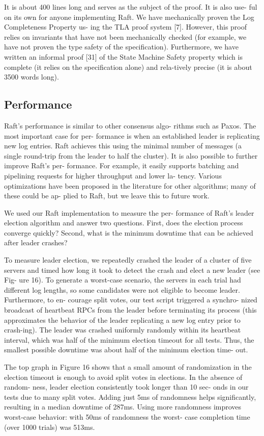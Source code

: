 \documentclass[journal]{IEEEtran}
\begin{document}
It is about 400 lines long and serves as the subject of the proof. It is also use- ful on its own for anyone implementing Raft. 
We have mechanically proven the Log Completeness Property us- ing the TLA proof system [7]. However, this proof relies on invariants that have not been mechanically checked (for example, we have not proven the type safety of the specification). Furthermore, we have written an informal proof [31] of the State Machine Safety property which is complete (it relies on the specification alone) and rela-tively precise (it is about 3500 words long).

\subsection{Performance}
Raft’s performance is similar to other consensus algo- rithms such as Paxos. The most important case for per- formance is when an established leader is replicating new log entries. Raft achieves this using the minimal number of messages (a single round-trip from the leader to half the cluster). It is also possible to further improve Raft’s per- formance. For example, it easily supports batching and pipelining requests for higher throughput and lower la- tency. Various optimizations have been proposed in the literature for other algorithms; many of these could be ap- plied to Raft, but we leave this to future work.

We used our Raft implementation to measure the per- formance of Raft’s leader election algorithm and answer two questions. First, does the election process converge quickly? Second, what is the minimum downtime that can be achieved after leader crashes?

To measure leader election, we repeatedly crashed the leader of a cluster of five servers and timed how long it took to detect the crash and elect a new leader (see Fig- ure 16). To generate a worst-case scenario, the servers in each trial had different log lengths, so some candidates were not eligible to become leader. Furthermore, to en- courage split votes, our test script triggered a synchro- nized broadcast of heartbeat RPCs from the leader before terminating its process (this approximates the behavior of the leader replicating a new log entry prior to crash-ing). The leader was crashed uniformly randomly within its heartbeat interval, which was half of the minimum election timeout for all tests. Thus, the smallest possible downtime was about half of the minimum election time- out.


The top graph in Figure 16 shows that a small amount of randomization in the election timeout is enough to avoid split votes in elections. In the absence of random- ness, leader election consistently took longer than 10 sec- onds in our tests due to many split votes. Adding just 5ms of randomness helps significantly, resulting in a median downtime of 287ms. Using more randomness improves worst-case behavior: with 50ms of randomness the worst- case completion time (over 1000 trials) was 513ms.
\end{document}
